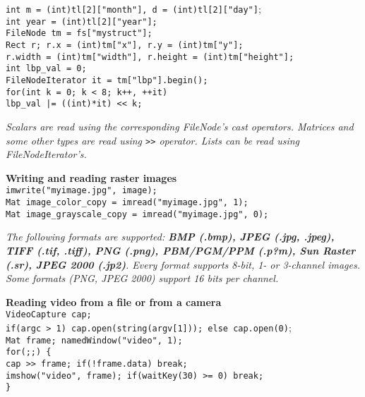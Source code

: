 \documentclass[10pt,landscape]{article}
\begin{document}
\begin{multicols}{3}
\begin{tabbing}
\texttt{int m = (int)tl[2]["month"], d = (int)tl[2]["day"]};\\
\texttt{int year = (int)tl[2]["year"];}\\

\texttt{FileNode tm = fs["mystruct"];}\\

\texttt{Rect r; r.x = (int)tm["x"], r.y = (int)tm["y"];}\\
\texttt{r.width = (int)tm["width"], r.height = (int)tm["height"];}\\
 
\texttt{int lbp\_val = 0;}\\
\texttt{FileNodeIterator it = tm["lbp"].begin();}\\

\texttt{for(int k = 0; k < 8; k++, ++it)}\\
\>\texttt{lbp\_val |= ((int)*it) << k;}\\
\end{tabbing}

\emph{Scalars are read using the corresponding FileNode's cast operators. Matrices and some other types are read using \texttt{>>} operator. Lists can be read using FileNodeIterator's.}

\begin{tabbing}
\textbf{Wr}\=\textbf{iting and reading raster images}\\
\texttt{imwrite("myimage.jpg", image);}\\
\texttt{Mat image\_color\_copy = imread("myimage.jpg", 1);}\\
\texttt{Mat image\_grayscale\_copy = imread("myimage.jpg", 0);}\\
\end{tabbing}

\emph{The following formats are supported: \textbf{BMP (.bmp), JPEG (.jpg, .jpeg), TIFF (.tif, .tiff), PNG (.png), PBM/PGM/PPM (.p?m), Sun Raster (.sr), JPEG 2000 (.jp2)}. Every format supports 8-bit, 1- or 3-channel images. Some formats (PNG, JPEG 2000) support 16 bits per channel.}

\begin{tabbing}
\textbf{Re}\=\textbf{ading video from a file or from a camera}\\
\texttt{VideoCapture cap;}\\
\texttt{if(argc > 1) cap.open(string(argv[1])); else cap.open(0)};\\
\texttt{Mat frame; namedWindow("video", 1);}\\
\texttt{for(;;) \{}\\
\>\texttt{cap >> frame; if(!frame.data) break;}\\
\>\texttt{imshow("video", frame); if(waitKey(30) >= 0) break;}\\
\texttt{\} }
\end{tabbing}


\end{multicols}
\end{document}

